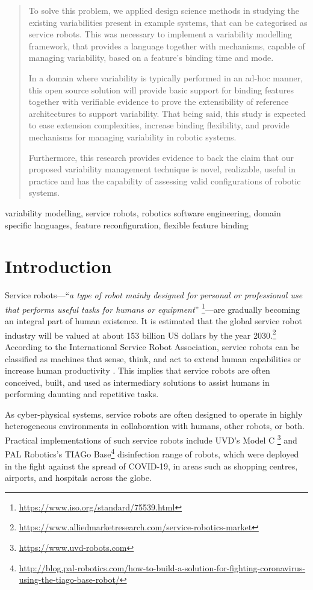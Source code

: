 \documentclass[conference]{IEEEtran}
\newcommand{\foot}[1]{\footnote{\url{#1}}}
\begin{document}
\begin{abstract}
To solve this problem, we applied design science methods in studying the existing variabilities present in example systems, that can be categorised as service robots. This was necessary to implement a variability modelling framework, that provides a language together with mechanisms, capable of managing variability, based on a feature's binding time and mode. 

In a domain where variability is typically performed in an ad-hoc manner, this open source solution will provide basic support for binding features together with verifiable evidence to prove the extensibility of reference architectures to support variability. That being said, this study is expected to ease extension complexities, increase binding flexibility, and provide mechanisms for managing variability in robotic systems.

Furthermore, this research provides evidence to back the claim that our proposed variability management technique is novel, realizable, useful in practice and has the capability of assessing valid configurations of robotic systems.
\end{abstract}

\begin{IEEEkeywords}
variability modelling, service robots, robotics software engineering, domain specific languages, feature reconfiguration, flexible feature binding
\end{IEEEkeywords}

\section{Introduction}
\label{section:intro}
Service robots---``{\em a type of robot mainly designed for personal or professional use that performs useful tasks for humans or equipment}'' \foot{https://www.iso.org/standard/75539.html}---are gradually becoming an integral part of human existence. It is estimated that the global service robot industry will be valued at about 153 billion US dollars by the year 2030.\foot{https://www.alliedmarketresearch.com/service-robotics-market}
According to the International Service Robot Association, service robots can be classified as machines that sense, think, and act to extend human capabilities or increase human productivity \cite{serv-rob-his}. This implies that service robots are often conceived, built, and used as intermediary solutions to assist humans in performing daunting and repetitive tasks.

As cyber-physical systems, service robots are often designed to operate in highly heterogeneous environments in collaboration with humans, other robots, or both. Practical implementations of such service robots include UVD's Model C \foot{https://www.uvd-robots.com} and PAL Robotics's TIAGo Base\foot{http://blog.pal-robotics.com/how-to-build-a-solution-for-fighting-coronavirus-using-the-tiago-base-robot/} 
disinfection range of robots, which were deployed in the fight against the spread of COVID-19, in areas such as shopping centres, airports, and hospitals across the globe.
\end{document}
